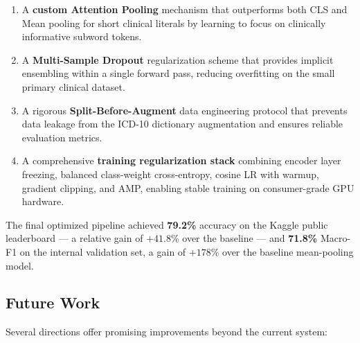 \documentclass[10pt,a4paper,twocolumn]{article}
\begin{document}
\begin{enumerate}
  \item A \textbf{custom Attention Pooling} mechanism that outperforms both
        CLS and Mean pooling for short clinical literals by learning to focus
        on clinically informative subword tokens.
  \item A \textbf{Multi-Sample Dropout} regularization scheme that provides
        implicit ensembling within a single forward pass, reducing overfitting
        on the small primary clinical dataset.
  \item A rigorous \textbf{Split-Before-Augment} data engineering protocol that
        prevents data leakage from the ICD-10 dictionary augmentation and
        ensures reliable evaluation metrics.
  \item A comprehensive \textbf{training regularization stack} combining encoder
        layer freezing, balanced class-weight cross-entropy, cosine LR with
        warmup, gradient clipping, and AMP, enabling stable training on
        consumer-grade GPU hardware.
\end{enumerate}

The final optimized pipeline achieved \textbf{79.2\%} accuracy on the Kaggle
public leaderboard --- a relative gain of $+41.8\%$ over the baseline --- and
\textbf{71.8\%} Macro-F1 on the internal validation set, a gain of $+178\%$
over the baseline mean-pooling model.

\subsection{Future Work}

Several directions offer promising improvements beyond the current system:
\end{document}
